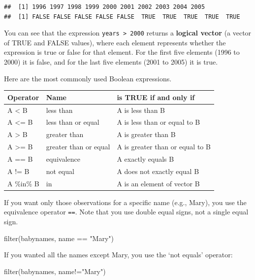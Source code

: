 \documentclass[
  oneside]{book}
\newenvironment{Shaded}{\begin{snugshade}}{\end{snugshade}}
\newcommand{\FunctionTok}[1]{\textcolor[rgb]{0.00,0.00,0.00}{#1}}
\newcommand{\NormalTok}[1]{#1}
\newcommand{\SpecialCharTok}[1]{\textcolor[rgb]{0.00,0.00,0.00}{#1}}
\newcommand{\StringTok}[1]{\textcolor[rgb]{0.31,0.60,0.02}{#1}}
\begin{document}
\begin{verbatim}
##  [1] 1996 1997 1998 1999 2000 2001 2002 2003 2004 2005
##  [1] FALSE FALSE FALSE FALSE FALSE  TRUE  TRUE  TRUE  TRUE  TRUE
\end{verbatim}

You can see that the expression \texttt{years\ \textgreater{}\ 2000} returns a \textbf{logical vector} (a vector of TRUE and FALSE values), where each element represents whether the expression is true or false for that element. For the first five elements (1996 to 2000) it is false, and for the last five elements (2001 to 2005) it is true.

Here are the most commonly used Boolean expressions.

\begin{longtable}[]{@{}lll@{}}
\toprule
Operator & Name & is TRUE if and only if \\
\midrule
\endhead
A \textless{} B & less than & A is less than B \\
A \textless= B & less than or equal & A is less than or equal to B \\
A \textgreater{} B & greater than & A is greater than B \\
A \textgreater= B & greater than or equal & A is greater than or equal to B \\
A == B & equivalence & A exactly equals B \\
A != B & not equal & A does not exactly equal B \\
A \%in\% B & in & A is an element of vector B \\
\bottomrule
\end{longtable}

If you want only those observations for a specific name (e.g., Mary), you use the equivalence operator \texttt{==}. Note that you use double equal signs, not a single equal sign.

\begin{Shaded}
\begin{Highlighting}[]
\FunctionTok{filter}\NormalTok{(babynames, name }\SpecialCharTok{==} \StringTok{"Mary"}\NormalTok{)}
\end{Highlighting}
\end{Shaded}

If you wanted all the names except Mary, you use the `not equals' operator:

\begin{Shaded}
\begin{Highlighting}[]
\FunctionTok{filter}\NormalTok{(babynames, name}\SpecialCharTok{!=}\StringTok{"Mary"}\NormalTok{) }
\end{Highlighting}
\end{Shaded}
\end{document}
